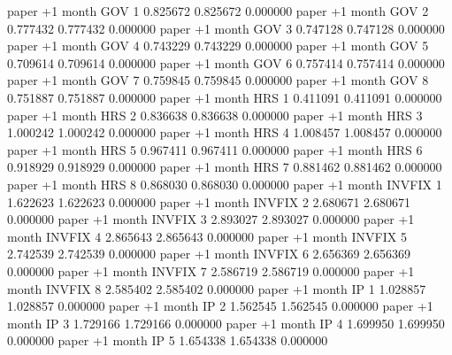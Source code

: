      paper  +1 month      GOV                 1 0.825672       0.825672           0.000000
     paper  +1 month      GOV                 2 0.777432       0.777432           0.000000
     paper  +1 month      GOV                 3 0.747128       0.747128           0.000000
     paper  +1 month      GOV                 4 0.743229       0.743229           0.000000
     paper  +1 month      GOV                 5 0.709614       0.709614           0.000000
     paper  +1 month      GOV                 6 0.757414       0.757414           0.000000
     paper  +1 month      GOV                 7 0.759845       0.759845           0.000000
     paper  +1 month      GOV                 8 0.751887       0.751887           0.000000
     paper  +1 month      HRS                 1 0.411091       0.411091           0.000000
     paper  +1 month      HRS                 2 0.836638       0.836638           0.000000
     paper  +1 month      HRS                 3 1.000242       1.000242           0.000000
     paper  +1 month      HRS                 4 1.008457       1.008457           0.000000
     paper  +1 month      HRS                 5 0.967411       0.967411           0.000000
     paper  +1 month      HRS                 6 0.918929       0.918929           0.000000
     paper  +1 month      HRS                 7 0.881462       0.881462           0.000000
     paper  +1 month      HRS                 8 0.868030       0.868030           0.000000
     paper  +1 month   INVFIX                 1 1.622623       1.622623           0.000000
     paper  +1 month   INVFIX                 2 2.680671       2.680671           0.000000
     paper  +1 month   INVFIX                 3 2.893027       2.893027           0.000000
     paper  +1 month   INVFIX                 4 2.865643       2.865643           0.000000
     paper  +1 month   INVFIX                 5 2.742539       2.742539           0.000000
     paper  +1 month   INVFIX                 6 2.656369       2.656369           0.000000
     paper  +1 month   INVFIX                 7 2.586719       2.586719           0.000000
     paper  +1 month   INVFIX                 8 2.585402       2.585402           0.000000
     paper  +1 month       IP                 1 1.028857       1.028857           0.000000
     paper  +1 month       IP                 2 1.562545       1.562545           0.000000
     paper  +1 month       IP                 3 1.729166       1.729166           0.000000
     paper  +1 month       IP                 4 1.699950       1.699950           0.000000
     paper  +1 month       IP                 5 1.654338       1.654338           0.000000

